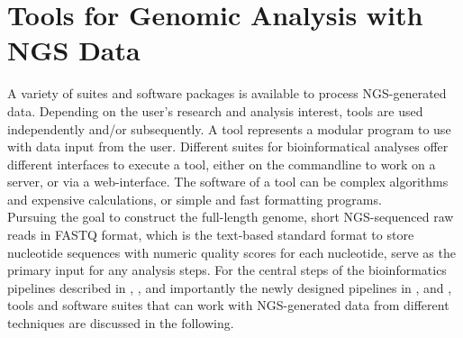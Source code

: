 \section{Tools for Genomic Analysis with NGS Data}
A variety of suites and software packages is available to process NGS-generated data. Depending on the user's research and analysis interest, tools are used independently and/or subsequently. A tool represents a modular program to use with data input from the user. Different suites for bioinformatical analyses offer different interfaces to execute a tool, either on the commandline to work on a server, or via a web-interface. The software of a tool can be complex algorithms and expensive calculations, or simple and fast formatting programs. \\
Pursuing the goal to construct the full-length genome, short NGS-sequenced raw reads in FASTQ format, which is the text-based standard format to store nucleotide sequences with numeric quality scores for each nucleotide, serve as the primary input for any analysis steps. For the central steps of the bioinformatics pipelines described in , ,  and importantly the newly designed pipelines in ,  and , tools and software suites that can work with NGS-generated data from different techniques are discussed in the following. 

